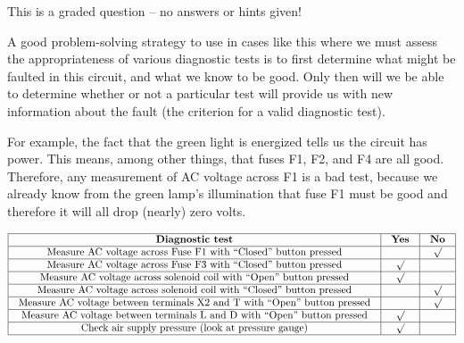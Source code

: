 \vfil 

\eject






This is a graded question -- no answers or hints given!







A good problem-solving strategy to use in cases like this where we must assess the appropriateness of various diagnostic tests is to first determine what might be faulted in this circuit, and what we know to be good.  Only then will we be able to determine whether or not a particular test will provide us with new information about the fault (the criterion for a valid diagnostic test).

For example, the fact that the green light is energized tells us the circuit has power.  This means, among other things, that fuses F1, F2, and F4 are all good.  Therefore, any measurement of AC voltage across F1 is a bad test, because we already know from the green lamp's illumination that fuse F1 must be good and therefore it will all drop (nearly) zero volts.


$$\vbox{\offinterlineskip
\halign{\strut
\vrule \quad\hfil # \ \hfil & 
\vrule \quad\hfil # \ \hfil & 
\vrule \quad\hfil # \ \hfil \vrule \cr
\noalign{\hrule}
%
{\bf Diagnostic test} & {\bf Yes} & {\bf No} \cr
%
\noalign{\hrule}
%
Measure AC voltage across Fuse F1 with ``Closed'' button pressed &  & $\surd$ \cr
%
\noalign{\hrule}
%
Measure AC voltage across Fuse F3 with ``Closed'' button pressed & $\surd$ &  \cr
%
\noalign{\hrule}
%
Measure AC voltage across solenoid coil with ``Open'' button pressed & $\surd$ &  \cr
%
\noalign{\hrule}
%
Measure AC voltage across solenoid coil with ``Closed'' button pressed &  & $\surd$ \cr
%
\noalign{\hrule}
%
Measure AC voltage between terminals X2 and T with ``Open'' button pressed &  & $\surd$ \cr
%
\noalign{\hrule}
%
Measure AC voltage between terminals L and D with ``Open'' button pressed & $\surd$ &  \cr
%
\noalign{\hrule}
%
Check air supply pressure (look at pressure gauge) & $\surd$ &  \cr
%
\noalign{\hrule}
} %
}$$ %

